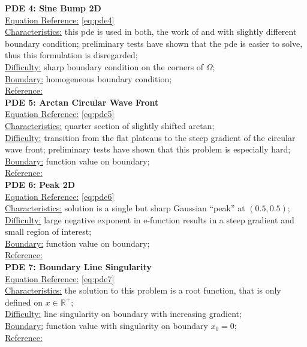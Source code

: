 \documentclass[./\jobname.tex]{subfiles}
\begin{document}
\textbf{PDE 4: Sine Bump 2D} \\
\underline{Equation Reference:} \eqref{eq:pde4} \\
\underline{Characteristics:} this \gls{pde} is used in both, the work of \cite{chaquet_using_2019} and  \cite{mitchell_nist_2018} with slightly different boundary condition; preliminary tests have shown that the \cite{chaquet_using_2019} \gls{pde} is easier to solve, thus this formulation is disregarded;\\
\underline{Difficulty:} sharp boundary condition on the corners of $\Omega$; \\
\underline{Boundary:} homogeneous boundary condition; \\
\underline{Reference:} \cite{mitchell_nist_2018}\\

\textbf{PDE 5: Arctan Circular Wave Front} \\
\underline{Equation Reference:} \eqref{eq:pde5} \\
\underline{Characteristics:} quarter section of slightly shifted arctan; \\
\underline{Difficulty:} transition from the flat plateaus to the steep gradient of the circular wave front; preliminary tests have shown that this problem is especially hard; \\
\underline{Boundary:} function value on boundary; \\
\underline{Reference:} \cite{mitchell_nist_2018} \\

\textbf{PDE 6: Peak 2D} \\
\underline{Equation Reference:} \eqref{eq:pde6} \\
\underline{Characteristics:} solution is a single but sharp Gaussian ``peak'' at $(0.5, 0.5)$; \\
\underline{Difficulty:} large negative exponent in e-function results in a steep gradient and small region of interest; \\
\underline{Boundary:} function value on boundary; \\
\underline{Reference:} \cite{mitchell_nist_2018} \\

\textbf{PDE 7: Boundary Line Singularity} \\
\underline{Equation Reference:} \eqref{eq:pde7} \\
\underline{Characteristics:} the solution to this problem is a root function, that is only defined on $x \in \mathbb{R}^{+}$; \\
\underline{Difficulty:} line singularity on boundary with increasing gradient; \\
\underline{Boundary:} function value with singularity on boundary $x_0 = 0$; \\
\underline{Reference:} \cite{mitchell_nist_2018} \\
\end{document}
